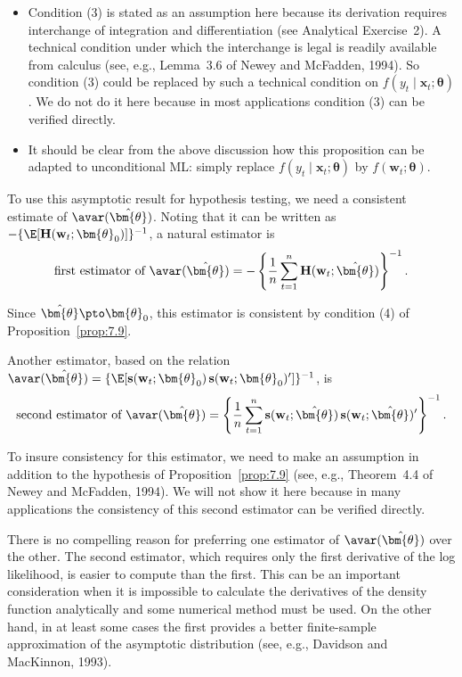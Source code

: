 \begin{itemize}
\item Condition (3) is stated as an assumption here because its derivation requires interchange of integration and differentiation (see Analytical Exercise~2). A technical condition under which the interchange is legal is readily available from calculus (see, e.g., Lemma~3.6 of Newey and McFadden, 1994). So condition (3) could be replaced by such a technical condition on $f(y_t \mid \mathbf{x}_t; \bm{\theta})$. We do not do it here because in most applications condition (3) can be verified directly.

\item It should be clear from the above discussion how this proposition can be adapted to unconditional ML: simply replace $f(y_t \mid \mathbf{x}_t; \bm{\theta})$ by $f(\mathbf{w}_t; \bm{\theta})$.
\end{itemize}

To use this asymptotic result for hypothesis testing, we need a consistent estimate of $\avar(\hat{\bm{\theta}})$. Noting that it can be written as $-\{\E[\mathbf{H}(\mathbf{w}_t; \bm{\theta}_0)]\}^{-1}$, a natural estimator is
\begin{equation}
\label{eq:7.3.14}
\text{first estimator of } \avar(\hat{\bm{\theta}}) = -\left\{ \frac{1}{n}\sum_{t=1}^{n}\mathbf{H}(\mathbf{w}_t; \hat{\bm{\theta}}) \right\}^{-1}.
\end{equation}

Since $\hat{\bm{\theta}} \pto \bm{\theta}_0$, this estimator is consistent by condition (4) of Proposition~\ref{prop:7.9}.

Another estimator, based on the relation $\avar(\hat{\bm{\theta}}) = \{\E[\mathbf{s}(\mathbf{w}_t; \bm{\theta}_0)\,\mathbf{s}(\mathbf{w}_t; \bm{\theta}_0)']\}^{-1}$, is
\begin{equation}
\label{eq:7.3.15}
\text{second estimator of } \avar(\hat{\bm{\theta}}) = \left\{ \frac{1}{n}\sum_{t=1}^{n}\mathbf{s}(\mathbf{w}_t; \hat{\bm{\theta}})\,\mathbf{s}(\mathbf{w}_t; \hat{\bm{\theta}})' \right\}^{-1}.
\end{equation}

To insure consistency for this estimator, we need to make an assumption in addition to the hypothesis of Proposition~\ref{prop:7.9} (see, e.g., Theorem~4.4 of Newey and McFadden, 1994). We will not show it here because in many applications the consistency of this second estimator can be verified directly.

There is no compelling reason for preferring one estimator of $\avar(\hat{\bm{\theta}})$ over the other. The second estimator, which requires only the first derivative of the log likelihood, is easier to compute than the first. This can be an important consideration when it is impossible to calculate the derivatives of the density function analytically and some numerical method must be used. On the other hand, in at least some cases the first provides a better finite-sample approximation of the asymptotic distribution (see, e.g., Davidson and MacKinnon, 1993).

